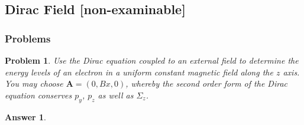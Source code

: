\documentclass[a4paper]{article}
\newtheorem{ans}{Answer}[section]
\theoremstyle{new}
\newtheorem{qns}{Problem}[section]
\begin{document}
\subsection{Dirac Field [non-examinable]}


\newpage
\subsubsection{Problems}
\begin{qns}
Use the Dirac equation coupled to an external field to determine the energy levels of an electron in a uniform constant magnetic field along the $z$ axis. You may choose $\mathbf{A} = (0, Bx, 0)$, whereby the second order form of the Dirac equation conserves $p_y$, $p_z$ as well as $\Sigma_z$.
\end{qns}
\begin{ans}

\end{ans}
\newpage
\end{document}
